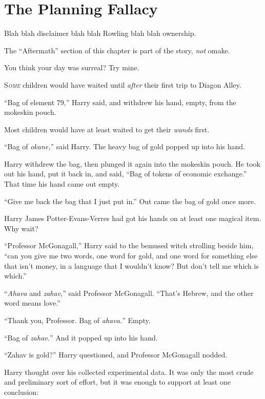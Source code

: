 \chapter{The Planning Fallacy}

\begin{chapterOpeningAuthorNote}
Blah blah disclaimer blah blah Rowling blah blah ownership.

The “Aftermath” section of this chapter is part of the story, \emph{not} omake.
\end{chapterOpeningAuthorNote}
\begin{chapterOpeningQuote}
You think your day was surreal? Try mine.
\end{chapterOpeningQuote}

\lettrine{S}{\emph{ome}} children would have waited until \emph{after} their first trip to Diagon Alley.

“Bag of element 79,” Harry said, and withdrew his hand, empty, from the mokeskin pouch.

Most children would have at least waited to get their \emph{wands} first.

“Bag of \emph{okane,}” said Harry. The heavy bag of gold popped up into his hand.

Harry withdrew the bag, then plunged it again into the mokeskin pouch. He took out his hand, put it back in, and said, “Bag of tokens of economic exchange.” That time his hand came out empty.

“Give me back the bag that I just put in.” Out came the bag of gold once more.

Harry James Potter-Evans-Verres had got his hands on at least one magical item. Why wait?

“Professor McGonagall,” Harry said to the bemused witch strolling beside him, “can you give me two words, one word for gold, and one word for something else that isn’t money, in a language that I wouldn’t know? But don’t tell me which is which.”

“\emph{Ahava} and \emph{zahav,}” said Professor McGonagall. “That’s Hebrew, and the other word means love.”

“Thank you, Professor. Bag of \emph{ahava.}” Empty.

“Bag of \emph{zahav.}” And it popped up into his hand.

“Zahav is gold?” Harry questioned, and Professor McGonagall nodded.

Harry thought over his collected experimental data. It was only the most crude and preliminary sort of effort, but it was enough to support at least one conclusion:

